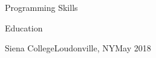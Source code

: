 \documentclass[]{xjavathehutt}
\begin{document}
  \begin{cvsection}{Programming Skills}
    \printskills
  \end{cvsection}

  \begin{cvsection}{Education}
    \begin{cvsubsection}{Siena College}{Loudonville, NY}{May 2018}
    \end{cvsubsection}
  \end{cvsection}

\end{document}

